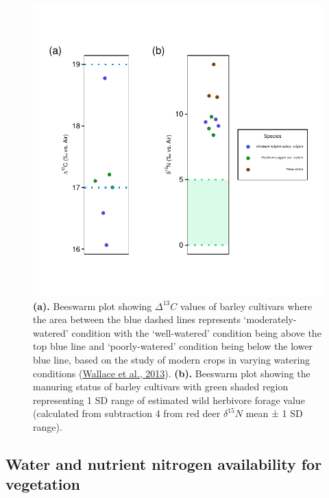 \documentclass[preprint, 3p, authoryear]{elsarticle} %
\begin{document}
\begin{figure}
\centering
\includegraphics{RPaladugu_Castro_files/figure-latex/iso-hord-plots-1.pdf}
\caption{\label{fig:iso-hord-plots}\textbf{(a).} Beeswarm plot showing \(\Delta ^{13}C\) values of barley cultivars where the area between the blue dashed lines represents `moderately-watered' condition with the `well-watered' condition being above the top blue line and `poorly-watered' condition being below the lower blue line, based on the study of modern crops in varying watering conditions (\protect\hyperlink{ref-wallace_etal13}{Wallace et al., 2013}). \textbf{(b).} Beeswarm plot showing the manuring status of barley cultivars with green shaded region representing 1 SD range of estimated wild herbivore forage value (calculated from subtraction 4 \text{\textperthousand} from red deer \(\delta ^{15}N\) mean ± 1 SD range).}
\end{figure}

\hypertarget{water-and-nutrient-nitrogen-availability-for-vegetation}{%
\subsection{Water and nutrient nitrogen availability for vegetation}\label{water-and-nutrient-nitrogen-availability-for-vegetation}}
\end{document}
